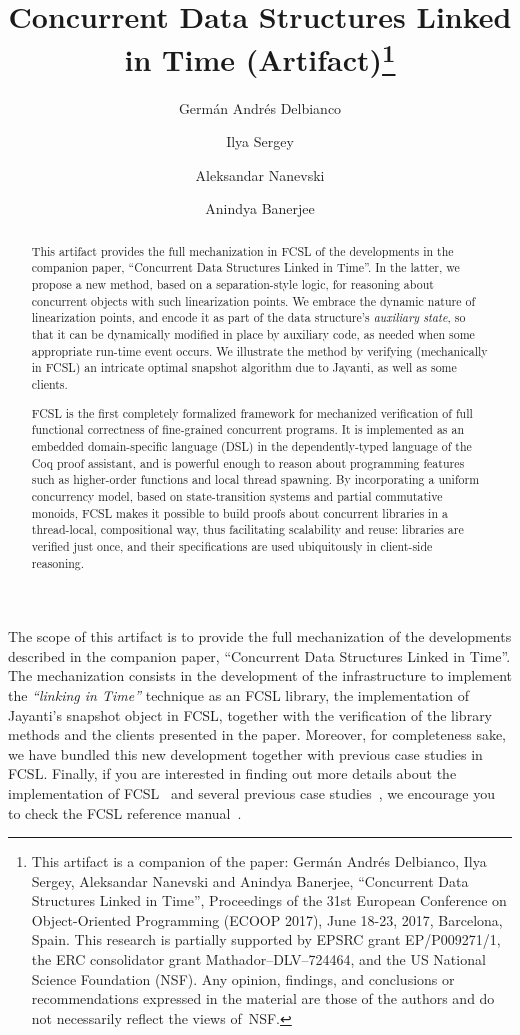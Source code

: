 \documentclass[a4paper,USenglish]{darts}
\title{Concurrent Data Structures Linked in Time
  (Artifact)\footnote{This artifact is a companion of the paper:
    Germ\'{a}n Andr\'{e}s Delbianco, Ilya Sergey, Aleksandar Nanevski
    and Anindya Banerjee, ``Concurrent Data Structures Linked in
    Time'', Proceedings of the 31st European Conference on
    Object-Oriented Programming (ECOOP 2017), June 18-23, 2017,
    Barcelona, Spain. This research is partially supported by EPSRC
    grant EP/P009271/1, the ERC consolidator grant
    Mathador--DLV--724464, and the US National Science Foundation
    (NSF). Any opinion, findings, and conclusions or recommendations
    expressed in the material are those of the authors and do not
    necessarily reflect the views of~NSF.}}
\author[1,2]{Germ\'{a}n Andr\'{e}s Delbianco}
\author[3]{Ilya Sergey}
\author[1]{Aleksandar Nanevski}
\author[1]{Anindya Banerjee}
\affil[1]{IMDEA Software Institute, Madrid, Spain\\
  {\texttt{\{german.delbianco,
      aleks.nanevski,anindya.banerjee\}@imdea.org}}}
\affil[2]{Universidad Polit\'{e}cnica de Madrid, Spain}
\affil[3]{University College London, United Kingdom\\
  {\texttt{i.sergey@ucl.ac.uk}}}
\begin{document}
\maketitle

\begin{abstract}
This artifact provides the full mechanization in FCSL of the
developments in the companion paper, ``Concurrent Data Structures
Linked in Time''. In the latter, we propose a new method, based on a
separation-style logic, for reasoning about concurrent objects with
such linearization points. We embrace the dynamic nature of
linearization points, and encode it as part of the data structure's
\emph{auxiliary state}, so that it can be dynamically modified in
place by auxiliary code, as needed when some appropriate run-time
event occurs. We illustrate the method by verifying (mechanically in
FCSL) an intricate optimal snapshot algorithm due to Jayanti, as well
as some clients.

FCSL is the first completely formalized framework for mechanized
verification of full functional correctness of fine-grained concurrent
programs. It is implemented as an embedded domain-specific language
(DSL) in the dependently-typed language of the Coq proof assistant,
and is powerful enough to reason about programming features such as
higher-order functions and local thread spawning. By incorporating a
uniform concurrency model, based on state-transition systems and
partial commutative monoids, FCSL makes it possible to build proofs
about concurrent libraries in a thread-local, compositional way, thus
facilitating scalability and reuse: libraries are verified just once,
and their specifications are used ubiquitously in client-side
reasoning.
\end{abstract}


\begin{scope}
  The scope of this artifact is to provide the full mechanization of
  the developments described in the companion paper, ``Concurrent Data
  Structures Linked in Time''. The mechanization consists in the
  development of the infrastructure to implement the \emph{``linking
    in Time''} technique as an FCSL library, the implementation of
  Jayanti's snapshot object in FCSL, together with the verification of
  the library methods and the clients presented in the
  paper. Moreover, for completeness sake, we have bundled this new
  development together with previous case studies in FCSL. Finally, if
  you are interested in finding out more details about the
  implementation of FCSL~\cite{NanevskiLSD+esop14, FCSL:Project} and
  several previous case
  studies~\cite{SergeyNB+ESOP15,SergeyNB+PLDI15,SergeyNBD+OOPSLA16},
  we encourage you to check the FCSL reference
  manual~\cite{FCSL:Manual}.

\end{scope}
\end{document}

